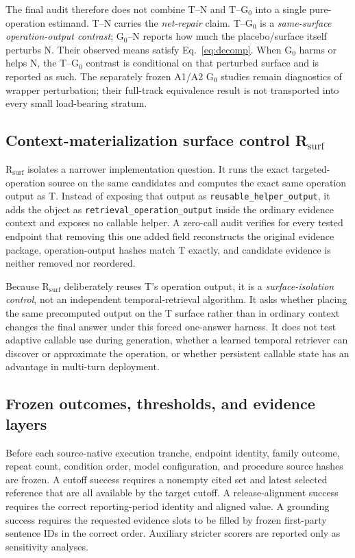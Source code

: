 The final audit therefore does not combine T--N and T--G$_0$ into a single pure-operation estimand. T--N carries the \emph{net-repair} claim. T--G$_0$ is a \emph{same-surface operation-output contrast}; G$_0$--N reports how much the placebo/surface itself perturbs N. Their observed means satisfy Eq.~\ref{eq:decomp}. When G$_0$ harms or helps N, the T--G$_0$ contrast is conditional on that perturbed surface and is reported as such. The separately frozen A1/A2 G$_0$ studies remain diagnostics of wrapper perturbation; their full-track equivalence result is not transported into every small load-bearing stratum.

\subsection{Context-materialization surface control R$_{\mathrm{surf}}$}
R$_{\mathrm{surf}}$ isolates a narrower implementation question. It runs the exact targeted-operation source on the same candidates and computes the exact same operation output as T. Instead of exposing that output as \texttt{reusable\_helper\_output}, it adds the object as \texttt{retrieval\_operation\_output} inside the ordinary evidence context and exposes no callable helper. A zero-call audit verifies for every tested endpoint that removing this one added field reconstructs the original evidence package, operation-output hashes match T exactly, and candidate evidence is neither removed nor reordered.

Because R$_{\mathrm{surf}}$ deliberately reuses T's operation output, it is a \emph{surface-isolation control}, not an independent temporal-retrieval algorithm. It asks whether placing the same precomputed output on the T surface rather than in ordinary context changes the final answer under this forced one-answer harness. It does not test adaptive callable use during generation, whether a learned temporal retriever can discover or approximate the operation, or whether persistent callable state has an advantage in multi-turn deployment.

\subsection{Frozen outcomes, thresholds, and evidence layers}
Before each source-native execution tranche, endpoint identity, family outcome, repeat count, condition order, model configuration, and procedure source hashes are frozen. A cutoff success requires a nonempty cited set and latest selected reference that are all available by the target cutoff. A release-alignment success requires the correct reporting-period identity and aligned value. A grounding success requires the requested evidence slots to be filled by frozen first-party sentence IDs in the correct order. Auxiliary stricter scorers are reported only as sensitivity analyses.

